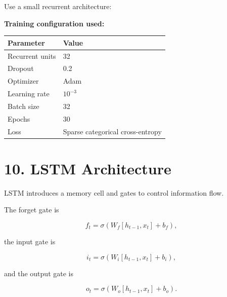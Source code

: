 \documentclass[10pt]{article}
\begin{document}
Use a small recurrent architecture:

\begin{center}
\end{center}

\textbf{Training configuration used:}

\begin{center}
\begin{tabular}{|l|l|}
\hline
Parameter & Value\\
\hline
Recurrent units & 32\\
Dropout & 0.2\\
Optimizer & Adam\\
Learning rate & $10^{-3}$\\
Batch size & 32\\
Epochs & 30\\
Loss & Sparse categorical cross-entropy\\
\hline
\end{tabular}
\end{center}

\section*{10. LSTM Architecture}

LSTM introduces a memory cell and gates to control information flow.

The forget gate is

\[
f_t=\sigma(W_f[h_{t-1},x_t]+b_f),
\]

the input gate is

\[
i_t=\sigma(W_i[h_{t-1},x_t]+b_i),
\]

and the output gate is

\[
o_t=\sigma(W_o[h_{t-1},x_t]+b_o).
\]
\end{document}
